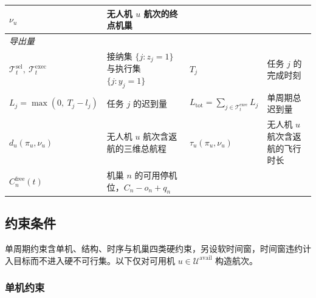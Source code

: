 \begin{table}[htbp]
\begin{tabularx}{\textwidth}{lXlX}
            $\nu_u$                                                        & 无人机 $u$ 航次的终点机巢                      &                                                                                                     &                                 \\
            \midrule
            \multicolumn{4}{l}{\emph{导出量}}                                                                                                                                                                                                                \\
            $\mathcal{T}_t^{\mathrm{sel}},\ \mathcal{T}_t^{\mathrm{exec}}$ & 接纳集 $\{j:z_j=1\}$ 与执行集 $\{j:y_j=1\}$ & $T_j$                                                                                               & 任务 $j$ 的完成时刻                    \\
            $L_j=\max(0,\ T_j-l_j)$                                        & 任务 $j$ 的迟到量                          & $L_{\mathrm{tot}}=\sum_{j\in\mathcal{T}_t^{\mathrm{exec}}}L_j$                                      & 单周期总迟到量                         \\
            $d_u(\pi_u,\nu_u)$                                             & 无人机 $u$ 航次含返航的三维总航程                  & $\tau_u(\pi_u,\nu_u)$                                                                               & 无人机 $u$ 航次含返航的飞行时长              \\
            $C_n^{\mathrm{free}}(t)$                                       & 机巢 $n$ 的可用停机位，$C_n-o_n+q_n$          &                                                                                                     &                                 \\
            \bottomrule
      \end{tabularx}
\end{table}

\subsection{约束条件}

单周期约束含单机、结构、时序与机巢四类硬约束，另设软时间窗，时间窗违约计入目标而不进入硬不可行集。以下仅对可用机 $u\in\mathcal{U}^{\mathrm{avail}}$ 构造航次。

\subsubsection*{单机约束}

